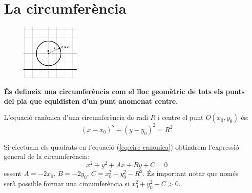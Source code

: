 
\section{La circumferència}

\begin{theorybox}
	\begin{figure} 
		\vspace{-0.5cm}
		\begin{center}
			\includegraphics[width=0.26\textwidth]{img-10/circ2}
			\end{center}
	 \end{figure}
	\textbf{És defineix una circumferència com el lloc geomètric de tots els punts del pla
	que equidisten d'un punt anomenat centre.}
	
	L'equació canònica d'una circumferència de radi $R$ i centre el punt $O(x_0, y_0)$ és:
	\begin{equation}
		\label{eq:circ-canonica}
		(x-x_0)^2+(y-y_0)^2=R^2
	\end{equation}
	
	Si efectuam els quadrats en l'equació (\ref{eq:circ-canonica}) obtindrem l'expressió general de la circumferència:
	\begin{equation}
		\label{eq:circ-genreal}
		x^2+y^2+Ax+By+C=0
	\end{equation}
	essent $A=-2x_0$, $B=-2y_0$, $C=x_0^2+y_0^2-R^2$. És important notar que només serà possible formar una circumferència si $x_0^2+y_0^2-C > 0$.
	
\end{theorybox}

